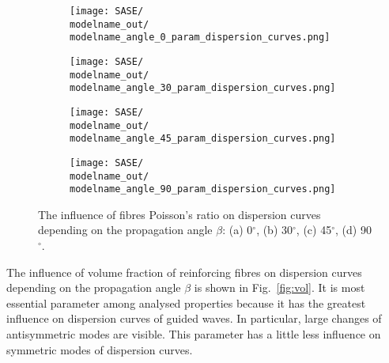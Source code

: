 \documentclass[preprint,12pt]{elsarticle}
\begin{document}
\begin{figure} [h!]
	\centering
	\newcommand{\modelname}{SASE7}
	\begin{subfigure}[b]{0.49\textwidth}
		\centering
		\texttt{[image: SASE/\\modelname\_out/\\modelname\_angle\_0\_param\_dispersion\_curves.png]}
		\caption{}
		\label{fig:nif0}
	\end{subfigure}
	\hfill
	\begin{subfigure}[b]{0.49\textwidth}
		\centering
		\texttt{[image: SASE/\\modelname\_out/\\modelname\_angle\_30\_param\_dispersion\_curves.png]}
		\caption{}
		\label{fig:nif30}
	\end{subfigure}
	\begin{subfigure}[b]{0.49\textwidth}
		\centering
		\texttt{[image: SASE/\\modelname\_out/\\modelname\_angle\_45\_param\_dispersion\_curves.png]}
		\caption{}
		\label{fig:nif45}
	\end{subfigure}
	\hfill
	\begin{subfigure}[b]{0.49\textwidth}
		\centering
		\texttt{[image: SASE/\\modelname\_out/\\modelname\_angle\_90\_param\_dispersion\_curves.png]}
		\caption{}
		\label{fig:nif90}
	\end{subfigure}
	\caption{The influence of fibres Poisson's ratio on dispersion curves depending on the propagation angle $\beta$: (a) 0$^{\circ}$, (b) 30$^{\circ}$, (c) 45$^{\circ}$, (d) 90$^{\circ}$.} 
	\label{fig:nif}
\end{figure}
\clearpage

The influence of volume fraction of reinforcing fibres on dispersion curves depending on the propagation angle $\beta$ is shown in Fig.~\ref{fig:vol}. It is most essential parameter among analysed properties because it has the greatest influence on dispersion curves of guided waves. In particular, large changes of antisymmetric modes are visible. This parameter has a little less influence on symmetric modes of dispersion curves. 
\end{document}
